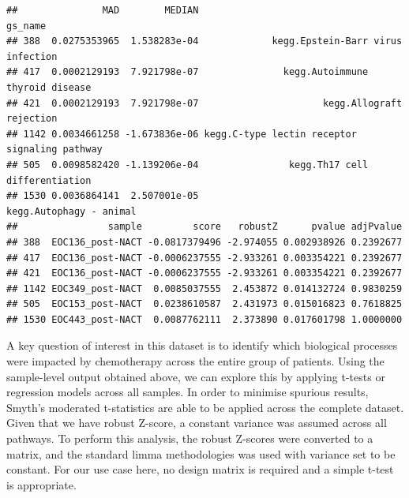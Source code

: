 \documentclass[9pt,a4paper,]{extarticle}
\begin{document}
\begin{verbatim}
##               MAD        MEDIAN                                       gs_name
## 388  0.0275353965  1.538283e-04             kegg.Epstein-Barr virus infection
## 417  0.0002129193  7.921798e-07               kegg.Autoimmune thyroid disease
## 421  0.0002129193  7.921798e-07                      kegg.Allograft rejection
## 1142 0.0034661258 -1.673836e-06 kegg.C-type lectin receptor signaling pathway
## 505  0.0098582420 -1.139206e-04                kegg.Th17 cell differentiation
## 1530 0.0036864141  2.507001e-05                       kegg.Autophagy - animal
##                sample         score   robustZ      pvalue adjPvalue
## 388  EOC136_post-NACT -0.0817379496 -2.974055 0.002938926 0.2392677
## 417  EOC136_post-NACT -0.0006237555 -2.933261 0.003354221 0.2392677
## 421  EOC136_post-NACT -0.0006237555 -2.933261 0.003354221 0.2392677
## 1142 EOC349_post-NACT  0.0085037555  2.453872 0.014132724 0.9830259
## 505  EOC153_post-NACT  0.0238610587  2.431973 0.015016823 0.7618825
## 1530 EOC443_post-NACT  0.0087762111  2.373890 0.017601798 1.0000000
\end{verbatim}

A key question of interest in this dataset is to identify which biological processes were impacted by chemotherapy across the entire group of patients.
Using the sample-level output obtained above, we can explore this by applying t-tests or regression models across all samples.
In order to minimise spurious results, Smyth's moderated t-statistics\citep{Smyth_2004} are able to be applied across the complete dataset.
Given that we have robust Z-score, a constant variance was assumed across all pathways.
To perform this analysis, the robust Z-scores were converted to a matrix, and the standard limma methodologies was used with variance set to be constant.
For our use case here, no design matrix is required and a simple t-test is appropriate.
\end{document}
